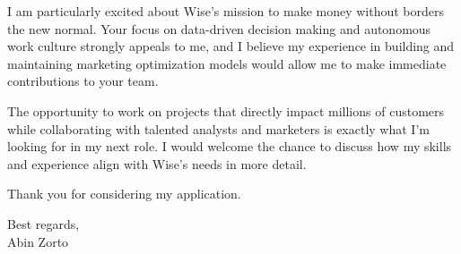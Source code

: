 \documentclass[10pt,a4paper]{article}
\begin{document}
I am particularly excited about Wise's mission to make money without borders the new normal. Your focus on data-driven decision making and autonomous work culture strongly appeals to me, and I believe my experience in building and maintaining marketing optimization models would allow me to make immediate contributions to your team.

The opportunity to work on projects that directly impact millions of customers while collaborating with talented analysts and marketers is exactly what I'm looking for in my next role. I would welcome the chance to discuss how my skills and experience align with Wise's needs in more detail.

Thank you for considering my application.

Best regards,\\
Abin Zorto
\end{document}
